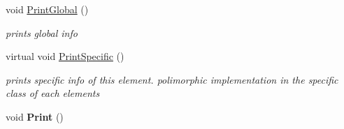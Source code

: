 \begin{DoxyCompactItemize}
\item 
void \hyperlink{classElement_afcde5aa81a52b90a8bcf903d9b773ebc}{Print\+Global} ()
\begin{DoxyCompactList}\small\item\em prints global info \end{DoxyCompactList}\item 
virtual void \hyperlink{classElement_adef0eb8aa2179a099c38d96217c237c0}{Print\+Specific} ()
\begin{DoxyCompactList}\small\item\em prints specific info of this element. polimorphic implementation in the specific class of each elements \end{DoxyCompactList}\item 
\hypertarget{classElement_a623ce34f0347c395e33e79ef43d9b93d}{void {\bfseries Print} ()}\label{classElement_a623ce34f0347c395e33e79ef43d9b93d}

\end{DoxyCompactItemize}
